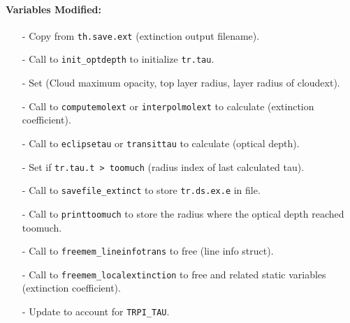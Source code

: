 \documentclass[letterpaper,12pt]{article}
\begin{document}
\paragraph{Variables Modified:}
\begin{enumerate}[leftmargin=10pt, noitemsep, parsep=0pt, topsep=0ex]
\item[-] Copy  from {\tt th.save.ext} (extinction
  output filename).
\item[-] Call to {\tt init\_optdepth} to initialize {\tt tr.tau}.
\item[-] Set 
  (Cloud maximum opacity, top layer radius, layer radius of cloudext).
\item[-] Call to {\tt computemolext} or {\tt interpolmolext} to calculate
   (extinction coefficient).
\item[-] Call to {\tt eclipsetau} or {\tt transittau} to calculate
   (optical depth).
\item[-] Set  if {\tt tr.tau.t > toomuch}
  (radius index of last calculated tau).
\item[-] Call to {\tt savefile\_extinct} to store {\tt tr.ds.ex.e} in
  file.
\item[-] Call to {\tt printtoomuch} to store the radius where the
  optical depth reached toomuch.
\item[-] Call to {\tt freemem\_lineinfotrans} to free
   (line info struct).
\item[-] Call to {\tt freemem\_localextinction} to free
   and related static variables (extinction
  coefficient).
\item[-] Update  to account for {\tt TRPI\_TAU}.
\end{enumerate}
\end{document}
